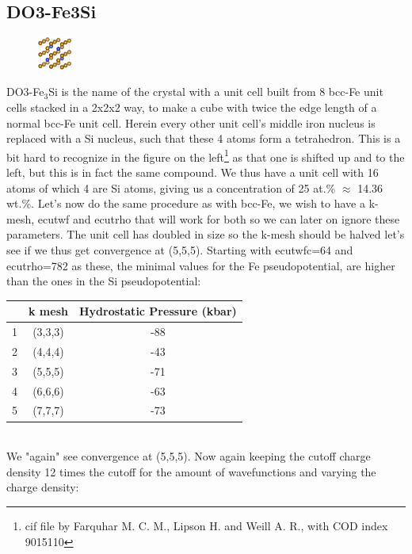 \documentclass[twoside,twocolumn,11pt]{article} %
\begin{document}
\subsection{DO3-Fe3Si}
\begin{figure}
  \begin{center}
	  \includegraphics[width=0.1\textwidth]{figures/DO3-Fe3Si_transl_no_background.png}
  \end{center}
\end{figure}
DO3-Fe$_3$Si is the name of the crystal with a unit cell built from 8 bcc-Fe
unit cells stacked in a 2x2x2 way, to make a cube with twice the edge length of
a normal bcc-Fe unit cell. Herein every other unit cell's middle iron nucleus
is replaced with a Si nucleus, such that these 4 atoms form a tetrahedron. This
is a bit hard to recognize in the figure on the left\footnote{cif file by Farquhar M. C. M.,
Lipson H. and Weill A. R., with COD index 9015110} as that one is shifted up
and to the left, but this is in fact the same compound.
We thus have a unit cell with 16 atoms of which 4 are Si atoms, giving us a concentration of 25 at.\% $\approx$ 14.36 wt.\%.
Let's now do the same procedure as with bcc-Fe, we wish to have a k-mesh,
ecutwf and ecutrho that will work for both so we can later on ignore these
parameters. The unit cell has doubled in size so the k-mesh should be halved
let's see if we thus get convergence at (5,5,5). Starting with ecutwfc=64 and
ecutrho=782 as these, the minimal values for the Fe pseudopotential, are higher
than the ones in the Si pseudopotential:
\begin{table}[ht]
\begin{tabular}{c|c|c}
	&k mesh&Hydrostatic Pressure (kbar)\\
	\hline
	1&(3,3,3)&-88\\
	2&(4,4,4)&-43\\
	3&(5,5,5)&-71\\
	4&(6,6,6)&-63\\
	5&(7,7,7)&-73\\
\end{tabular}
\end{table}\\
We "again" see convergence at (5,5,5). Now again keeping the cutoff charge density 12 times the cutoff
for the amount of wavefunctions and varying the charge density:
\end{document}
